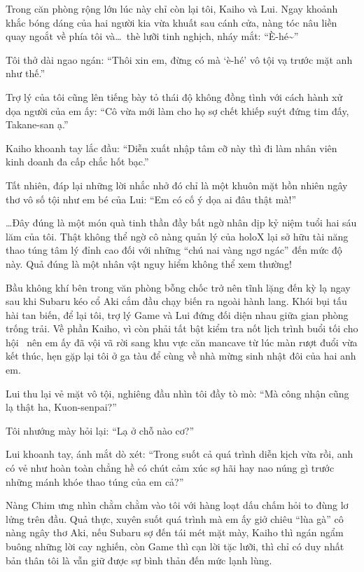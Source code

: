 \documentclass[../main.tex]{subfiles}
\begin{document}

Trong căn phòng rộng lớn lúc này chỉ còn lại tôi, Kaiho và Lui. Ngay khoảnh khắc bóng dáng của hai người kia vừa khuất sau cánh cửa, nàng tóc nâu liền quay ngoắt về phía tôi và\dots\ thè lưỡi tinh nghịch, nháy mắt: ``È-hé\~{}''

Tôi thở dài ngao ngán: ``Thôi xin em, đừng có mà `è-hé' vô tội vạ trước mặt anh như thế.''

Trợ lý của tôi cũng lên tiếng bày tỏ thái độ không đồng tình với cách hành xử dọa người của em ấy: ``Cô vừa mới làm cho họ sợ chết khiếp suýt đứng tim đấy, Takane-san ạ.''

Kaiho khoanh tay lắc đầu: ``Diễn xuất nhập tâm cỡ này thì đi làm nhân viên kinh doanh đa cấp chắc hốt bạc.''

Tất nhiên, đáp lại những lời nhắc nhở đó chỉ là một khuôn mặt hồn nhiên ngây thơ vô số tội như em bé của Lui: ``Em có cố ý dọa ai đâu thật mà!''

\dots Đây đúng là một món quà tinh thần đầy bất ngờ nhân dịp kỷ niệm tuổi hai sáu lăm của tôi. Thật không thể ngờ cô nàng quản lý của holoX lại sở hữu tài năng thao túng tâm lý đỉnh cao đối với những ``chú nai vàng ngơ ngác'' đến mức độ này. Quả đúng là một nhân vật nguy hiểm không thể xem thường!

\omk

Bầu không khí bên trong văn phòng bỗng chốc trở nên tĩnh lặng đến kỳ lạ ngay sau khi Subaru kéo cổ Aki cắm đầu chạy biến ra ngoài hành lang. Khói bụi tấu hài tan biến, để lại tôi, trợ lý Game và Lui đứng đối diện nhau giữa gian phòng trống trải. Về phần Kaiho, vì còn phải tất bật kiểm tra nốt lịch trình buổi tối cho hội \hls\ nên em ấy đã vội vã rời sang khu vực căn mancave từ lúc màn rượt đuổi vừa kết thúc, hẹn gặp lại tôi ở ga tàu để cùng về nhà mừng sinh nhật đôi của hai anh em.

Lui thu lại vẻ mặt vô tội, nghiêng đầu nhìn tôi đầy tò mò: ``Mà công nhận cũng lạ thật ha, Kuon-senpai?''

Tôi nhướng mày hỏi lại: ``Lạ ở chỗ nào cơ?''

Lui khoanh tay, ánh mắt dò xét: ``Trong suốt cả quá trình diễn kịch vừa rồi, anh có vẻ như hoàn toàn chẳng hề có chút cảm xúc sợ hãi hay nao núng gì trước những mánh khóe thao túng của em cả?''

Nàng Chim ưng nhìn chằm chằm vào tôi với hàng loạt dấu chấm hỏi to đùng lơ lửng trên đầu. Quả thực, xuyên suốt quá trình mà em ấy giở chiêu ``lùa gà'' cô nàng ngây thơ Aki, nếu Subaru sợ đến tái mét mặt mày, Kaiho thì ngán ngẩm buông những lời cay nghiến, còn Game thì cạn lời tặc lưỡi, thì chỉ có duy nhất bản thân tôi là vẫn giữ được sự bình thản đến mức lạnh lùng.
\end{document}
